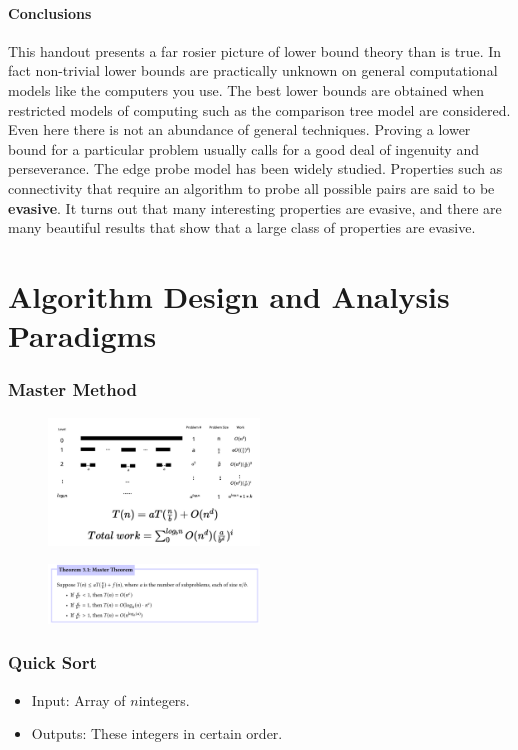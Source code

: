 \documentclass[en,hazy,blue,screen,14pt]{elegantnote}
\begin{document}
\subsection{Conclusions }

This handout presents a far rosier picture of lower bound theory than
is true. In fact non-trivial lower bounds are practically unknown
on general computational models like the computers you use. The best
lower bounds are obtained when restricted models of computing such
as the comparison tree model are considered. Even here there is not
an abundance of general techniques. Proving a lower bound for a particular
problem usually calls for a good deal of ingenuity and perseverance.
The edge probe model has been widely studied. Properties such as connectivity
that require an algorithm to probe all possible pairs are said to
be \textbf{evasive}. It turns out that many interesting properties
are evasive, and there are many beautiful results that show that a
large class of properties are evasive. 

\part{Algorithm Design and Analysis Paradigms}

\section{Master Method}
\begin{figure}[H]
	\centering
	\includegraphics[width=0.5\textwidth]{master-method.png}
\end{figure}
\begin{figure}[H]
	\centering
	\includegraphics[width=0.5\textwidth]{master-method-2.png}
\end{figure}
\section{Quick Sort}
\begin{itemize}
\item Input: Array of $n$integers.
\item Outputs: These integers in certain order.
\end{itemize}
\end{document}
